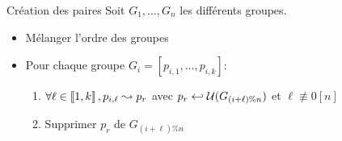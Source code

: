 \documentclass[10pt, compress]{beamer}
\begin{document}
  \begin{frame}{Création des paires}
    Soit \(G_1,\ldots,G_n\) les différents groupes.
    \begin{itemize}
      \item \alert{Mélanger} l'ordre des groupes
      \item Pour chaque groupe \(G_i = [p_{i, 1}, \ldots, p_{i, k}]\):
      \begin{enumerate}
        \item \(\forall \ell \in \left\llbracket1, k\right\rrbracket, p_{i, \ell} \leadsto p_r\) avec \(p_r\hookleftarrow\mathcal{U}(G_{(i+\ell)\%n})\) et \(\ell \not \equiv 0 [n]\)
        \item \alert{Supprimer} \(p_r\) de \(G_{(i+\ell)\%n}\)
      \end{enumerate}
    \end{itemize}
  \end{frame}
\end{document}

